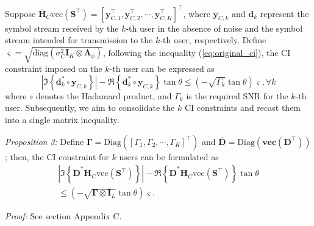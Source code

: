 \documentclass[lettersize,journal]{IEEEtran}
\newcommand{\nocolor}[1]{{\color{black}#1}}
\begin{document}
Suppose $\overline{\mathbf{H}}_C\text{vec}(\mathbf{S}^{\top})=[\mathbf{y}_{C,1}^{\top},\mathbf{y}_{C,2}^{\top},\cdots,\mathbf{y}_{C,K}^{\top}]^{\top}$, where $\mathbf{y}_{C,k}$ and $\mathbf{d}_k$ represent the symbol stream received by the $k$-th user in the absence of noise and the symbol stream intended for transmission to the $k$-th user, respectively. Define $\bm{\varsigma}=\sqrt{\mathrm{diag}(\sigma_C^2\mathbf{I}_K\otimes\mathbf{\Lambda}_{\phi})}$, following the inequality (\ref{eq:original_ci}), the CI constraint imposed on the $k$-th user can be expressed as
\begin{equation}
    \left| \Im\left\{\mathbf{d}_k^*\circ\mathbf{y}_{C,k}\right\} \right| - \Re\left\{\mathbf{d}_k^*\circ\mathbf{y}_{C,k}\right\}\tan\theta \leq (-\sqrt{\Gamma_k}\tan\theta)\bm{\varsigma},\forall k
\end{equation}
where \nocolor{$\circ$ denotes the Hadamard product, and} $\Gamma_k$ is the required SNR for the $k$-th user. Subsequently, we aim to consolidate the $k$ CI constraints and recast them into a single matrix inequality.

\textit{Proposition 3:} Define $\mathbf{\Gamma}=\mathrm{Diag}([\Gamma_1,\Gamma_2,\cdots,\Gamma_K]^{\top})$ and $\overline{\mathbf{D}}=\mathrm{Diag}(\mathbf{\text{vec}(\mathbf{D}^{\top})})$ ; then, the CI constraint for $k$ users can be formulated as
\begin{equation}
\label{eq:mimo_ci}
\begin{aligned}
    \left| \Im\left\{\overline{\mathbf{D}}^{*}\overline{\mathbf{H}}_C\text{vec}(\mathbf{S}^{\top})\right\} \right| - \Re\left\{\overline{\mathbf{D}}^{*}\overline{\mathbf{H}}_C\text{vec}(\mathbf{S}^{\top})\right\}\tan\theta \\
    \leq (-\sqrt{\mathbf{\Gamma}\otimes\mathbf{I}_L}\tan\theta)\bm{\varsigma}.
\end{aligned}
\end{equation}

\textit{Proof:} \nocolor{See section Appendix C}.
\end{document}
